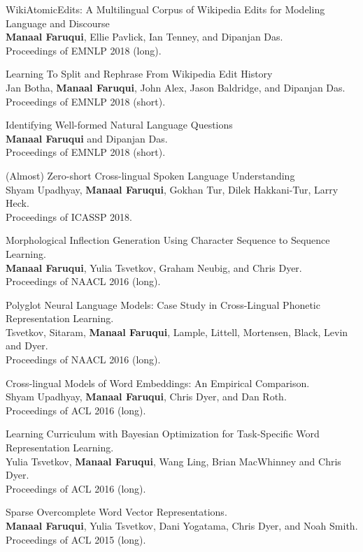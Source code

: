 \documentclass[margin,line]{res}
\begin{document}
\begin{resume}
WikiAtomicEdits: A Multilingual Corpus of Wikipedia Edits for Modeling Language and Discourse\\
\textbf{Manaal Faruqui}, Ellie Pavlick, Ian Tenney, and Dipanjan Das.\\
Proceedings of EMNLP 2018 (long).

Learning To Split and Rephrase From Wikipedia Edit History\\
Jan Botha, \textbf{Manaal Faruqui}, John Alex, Jason Baldridge, and Dipanjan Das.\\
Proceedings of EMNLP 2018 (short).

Identifying Well-formed Natural Language Questions\\
\textbf{Manaal Faruqui} and Dipanjan Das.\\
Proceedings of EMNLP 2018 (short).

(Almost) Zero-short Cross-lingual Spoken Language Understanding\\
Shyam Upadhyay, \textbf{Manaal Faruqui}, Gokhan Tur, Dilek Hakkani-Tur, Larry Heck.\\
Proceedings of ICASSP 2018.

Morphological Inflection Generation Using Character Sequence to Sequence Learning.\\
\textbf{Manaal Faruqui}, Yulia Tsvetkov, Graham Neubig, and Chris Dyer.\\
Proceedings of NAACL 2016 (long).

Polyglot Neural Language Models: Case Study in Cross-Lingual Phonetic Representation Learning.\\
Tsvetkov, Sitaram, \textbf{Manaal Faruqui}, Lample, Littell, Mortensen, Black,  Levin and Dyer.\\
Proceedings of NAACL 2016 (long).

Cross-lingual Models of Word Embeddings: An Empirical Comparison.\\
Shyam Upadhyay, \textbf{Manaal Faruqui}, Chris Dyer, and Dan Roth.\\
Proceedings of ACL 2016 (long).

Learning Curriculum with Bayesian Optimization for Task-Specific Word Representation Learning.\\
Yulia Tsvetkov, \textbf{Manaal Faruqui}, Wang Ling, Brian MacWhinney and Chris Dyer.\\
Proceedings of ACL 2016 (long).

Sparse Overcomplete Word Vector Representations.\\
\textbf{Manaal Faruqui}, Yulia Tsvetkov, Dani Yogatama, Chris Dyer, and Noah Smith.\\
Proceedings of ACL 2015 (long).


\end{resume}
\end{document}
